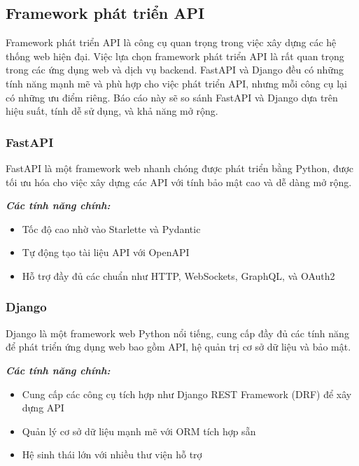 \subsection{Framework phát triển API}

Framework phát triển API là công cụ quan trọng trong việc xây dựng các hệ thống web hiện đại. Việc lựa chọn framework phát triển API là rất quan trọng trong các ứng dụng web và dịch vụ backend. FastAPI và Django đều có những tính năng mạnh mẽ và phù hợp cho việc phát triển API, nhưng mỗi công cụ lại có những ưu điểm riêng. Báo cáo này sẽ so sánh FastAPI và Django dựa trên hiệu suất, tính dễ sử dụng, và khả năng mở rộng.

\subsubsection{FastAPI}
FastAPI là một framework web nhanh chóng được phát triển bằng Python, được tối ưu hóa cho việc xây dựng các API với tính bảo mật cao và dễ dàng mở rộng.

\par \textbf{\textit{Các tính năng chính:}} \begin{itemize} \item Tốc độ cao nhờ vào Starlette và Pydantic \item Tự động tạo tài liệu API với OpenAPI \item Hỗ trợ đầy đủ các chuẩn như HTTP, WebSockets, GraphQL, và OAuth2 \end{itemize}

\subsubsection{Django}
Django là một framework web Python nổi tiếng, cung cấp đầy đủ các tính năng để phát triển ứng dụng web bao gồm API, hệ quản trị cơ sở dữ liệu và bảo mật.

\par \textbf{\textit{Các tính năng chính:}} \begin{itemize} \item Cung cấp các công cụ tích hợp như Django REST Framework (DRF) để xây dựng API \item Quản lý cơ sở dữ liệu mạnh mẽ với ORM tích hợp sẵn \item Hệ sinh thái lớn với nhiều thư viện hỗ trợ \end{itemize}

